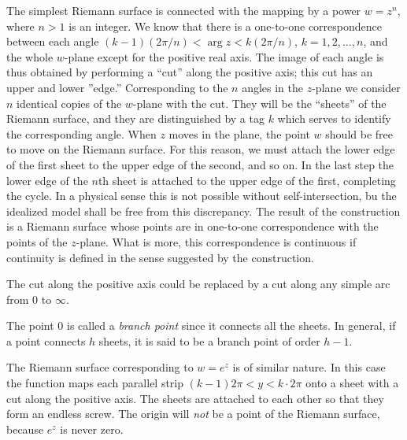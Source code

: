 \begin{example}
    The simplest Riemann surface is connected with the mapping by a power $w=z^n$, where $n>1$ is an integer. We know that there is a one-to-one correspondence between each angle $(k-1)(2\pi/n)<\arg z<k(2\pi/n)$, $k=1,2,\dots,n$, and the whole $w$-plane except for the positive real axis. The image of each angle is thus obtained by performing a ``cut'' along the positive axis; this cut has an upper and lower ''edge.'' Corresponding to the $n$ angles in the $z$-plane we consider $n$ identical copies of the $w$-plane with the cut. They will be the ``sheets'' of the Riemann surface, and they are distinguished by a tag $k$ which serves to identify the corresponding angle. When $z$ moves in the plane, the point $w$ should be free to move on the Riemann surface. For this reason, we must attach the lower edge of the first sheet to the upper edge of the second, and so on. In the last step the lower edge of the $n$th sheet is attached to the upper edge of the first, completing the cycle. In a physical sense this is not possible without self-intersection, bu the idealized model shall be free from this discrepancy. The result of the construction is a Riemann surface whose points are in one-to-one correspondence with the points of the $z$-plane. What is more, this correspondence is continuous if continuity is defined in the sense suggested by the construction.

    The cut along the positive axis could be replaced by a cut along any simple arc from $0$ to $\infty$.

    The point $0$ is called a \emph{branch point} since it connects all the sheets. In general, if a point connects $h$ sheets, it is said to be a branch point of order $h-1$.
\end{example}

\begin{example}
    The Riemann surface corresponding to $w=e^z$ is of similar nature. In this case the function maps each parallel strip $(k-1)2\pi<y<k \cdot 2\pi$ onto a sheet with a cut along the positive axis. The sheets are attached to each other so that they form an endless screw. The origin will \textit{not} be a point of the Riemann surface, because $e^z$ is never zero.
\end{example}
